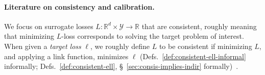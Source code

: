 \documentclass{article} %
\newcommand{\Comments}{0}
\newcommand{\mynote}[2]{\ifnum\Comments=1\textcolor{#1}{#2}\fi}
\newcommand{\mytodo}[2]{\ifnum\Comments=1%
	\todo[linecolor=#1!80!black,backgroundcolor=#1,bordercolor=#1!80!black]{#2}\fi}
\newcommand{\jessie}[1]{\mynote{teal}{[JF: #1]}}
\newcommand{\jessiet}[1]{\mytodo{teal!20!white}{JF: #1}}
\newcommand{\bo}[1]{\mynote{blue}{[Bo: #1]}}
\newcommand{\reals}{\mathbb{R}}
\newcommand{\Y}{\mathcal{Y}}
\begin{document}
\paragraph{Literature on consistency and calibration.}%
We focus on surrogate losses $L: \reals^d \times \Y \to \reals$ that are consistent, roughly meaning that minimizing $L$-loss corresponds to solving the target problem of interest.
When given a \emph{target loss} $\ell$, we roughly define $L$ to be consistent if minimizing $L$, and applying a link function, minimizes $\ell$ (Defs.~\ref{def:consistent-ell-informal} informally; Defs.~\ref{def:consistent-ell}, \S~\ref{sec:consis-implies-indir} formally)~\citep{zhang2004statistical,bartlett2006convexity,tewari2007consistency,steinwart2007compare,ramaswamy2016convex}.
\end{document}
